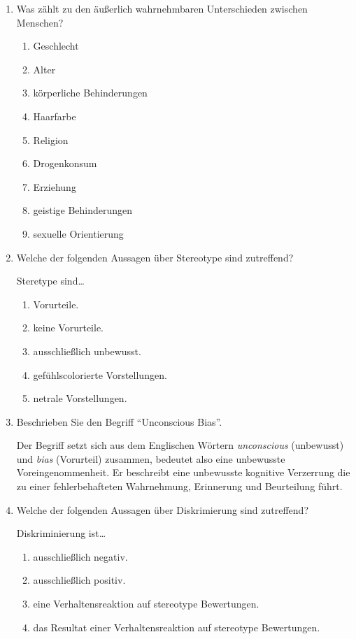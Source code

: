\documentclass{article}
\begin{document}
    \begin{enumerate}
        \item Was zählt zu den äußerlich wahrnehmbaren Unterschieden zwischen Menschen?
        \begin{enumerate}[label=(\alph*)]
            \item Geschlecht
            \item Alter
            \item körperliche Behinderungen
            \item Haarfarbe
            \item Religion
            \item Drogenkonsum
            \item Erziehung
            \item geistige Behinderungen
            \item sexuelle Orientierung
        \end{enumerate}
        
        \item Welche der folgenden Aussagen über Stereotype sind zutreffend?
        
        Steretype sind\ldots
        
        \begin{enumerate}[label=(\alph*)]
            \item Vorurteile.
            \item keine Vorurteile.
            \item ausschließlich unbewusst.
            \item gefühlscolorierte Vorstellungen.
            \item netrale Vorstellungen.
        \end{enumerate}
        
        \item Beschrieben Sie den Begriff \enquote{Unconscious Bias}.
        
        Der Begriff setzt sich aus dem Englischen Wörtern \emph{unconscious} (unbewusst) und \emph{bias} (Vorurteil) zusammen, bedeutet also eine unbewusste Voreingenommenheit. Er beschreibt eine unbewusste kognitive Verzerrung die zu einer fehlerbehafteten Wahrnehmung, Erinnerung und Beurteilung führt.
        
        \item Welche der folgenden Aussagen über Diskrimierung sind zutreffend?
        
        Diskriminierung ist\ldots
        
        \begin{enumerate}[label=(\alph*)]
            \item ausschließlich negativ.
            \item ausschließlich positiv.
            \item eine Verhaltensreaktion auf stereotype Bewertungen.
            \item das Resultat einer Verhaltensreaktion auf stereotype Bewertungen.
        \end{enumerate}
    \end{enumerate}
\end{document}
